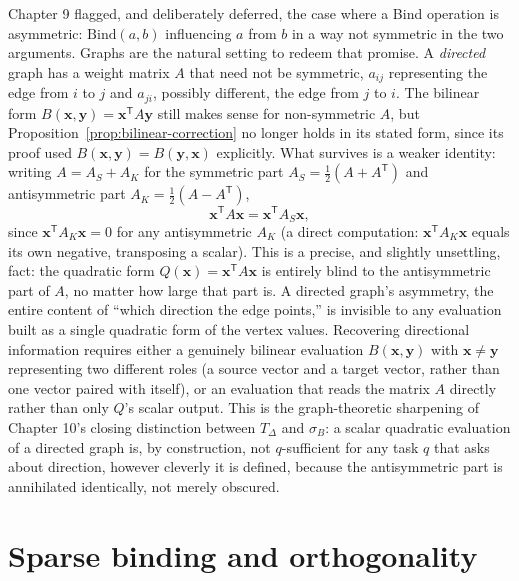 \documentclass[11pt]{book}
\begin{document}
Chapter 9 flagged, and deliberately deferred, the case where a Bind operation is asymmetric: $\mathrm{Bind}(a,b)$ influencing $a$ from $b$ in a way not symmetric in the two arguments. Graphs are the natural setting to redeem that promise. A \emph{directed} graph has a weight matrix $A$ that need not be symmetric, $a_{ij}$ representing the edge from $i$ to $j$ and $a_{ji}$, possibly different, the edge from $j$ to $i$. The bilinear form $B(\mathbf{x},\mathbf{y})=\mathbf{x}^{\mathsf T}A\mathbf{y}$ still makes sense for non-symmetric $A$, but Proposition~\ref{prop:bilinear-correction} no longer holds in its stated form, since its proof used $B(\mathbf{x},\mathbf{y})=B(\mathbf{y},\mathbf{x})$ explicitly. What survives is a weaker identity: writing $A=A_S+A_K$ for the symmetric part $A_S=\tfrac12(A+A^{\mathsf T})$ and antisymmetric part $A_K=\tfrac12(A-A^{\mathsf T})$,
\[
\mathbf{x}^{\mathsf T}A\mathbf{x} = \mathbf{x}^{\mathsf T}A_S\mathbf{x},
\]
since $\mathbf{x}^{\mathsf T}A_K\mathbf{x}=0$ for any antisymmetric $A_K$ (a direct computation: $\mathbf{x}^{\mathsf T}A_K\mathbf{x}$ equals its own negative, transposing a scalar). This is a precise, and slightly unsettling, fact: the quadratic form $Q(\mathbf{x})=\mathbf{x}^{\mathsf T}A\mathbf{x}$ is entirely blind to the antisymmetric part of $A$, no matter how large that part is. A directed graph's asymmetry, the entire content of ``which direction the edge points,'' is invisible to any evaluation built as a single quadratic form of the vertex values. Recovering directional information requires either a genuinely bilinear evaluation $B(\mathbf{x},\mathbf{y})$ with $\mathbf{x}\ne\mathbf{y}$ representing two different roles (a source vector and a target vector, rather than one vector paired with itself), or an evaluation that reads the matrix $A$ directly rather than only $Q$'s scalar output. This is the graph-theoretic sharpening of Chapter 10's closing distinction between $T_\Delta$ and $\sigma_B$: a scalar quadratic evaluation of a directed graph is, by construction, not $q$-sufficient for any task $q$ that asks about direction, however cleverly it is defined, because the antisymmetric part is annihilated identically, not merely obscured.

\section{Sparse binding and orthogonality}
\end{document}

